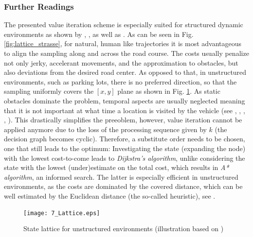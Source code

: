 \subsubsection{Further Readings}\label{S:57.3.3.4}
The presented value iteration scheme is especially suited for structured dynamic environments as shown by \cite{zieg09spatemp},%
\cite{McNaughton2011diss},%
as well as \cite{Gu2012}.%
As can be seen in Fig. \ref{fig:lattice_strasse}, for natural, human like trajectories it is most advantageous to align the sampling along and across the road course. The costs usually penalize not only jerky, accelerant movements, and the approximation to obstacles, but also deviations from the desired road center. 
As opposed to that, in unstructured environments, such as parking lots, there is no preferred direction, so that the sampling uniformly covers the $[x,y]$ plane as shown in  Fig. \ref{fig:lattice}. 
As static obstacles dominate the problem, temporal aspects are usually neglected meaning that it is not important at what time a location is visited by the vehicle (see \cite{montemerlo2008junior},%
\cite{zieglerIV08},%
\cite{pivtoraiko2009differentially},%
\cite{likhachev2009planning},%
\cite{dolgov2010path}).%
This drastically simplifies the preeoblem, however, value iteration cannot be applied anymore due to the loss of the processing sequence given by $k$ (the decision graph becomes cyclic). Therefore, a substitute order needs to be chosen, one that still leads to the optimum: Investigating the state (expanding the node) with the lowest cost-to-come leads to \emph{Dijkstra's algorithm}, unlike considering the state with the lowest (under)estimate on the total cost, which results in \emph{A* algorithm}, an informed search.
 The latter is especially efficient in unstructured environments, as the costs are dominated by the covered distance, which can be well estimated by the Euclidean distance (the so-called heuristic), see \cite{bertsekas2007}.%


\begin{figure}[h]
\centering
  	\texttt{[image: 7\_Lattice.eps]}
	\caption[State lattice for unstructured environments]{State lattice for unstructured environments (illustration based on \cite{mcnaughton})}
	\label{fig:lattice}
\end{figure}


